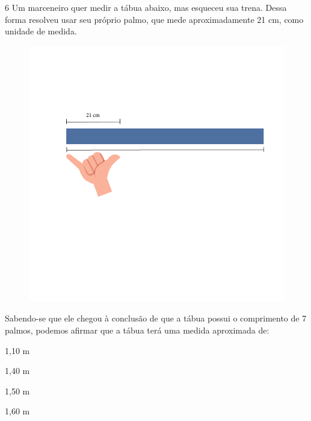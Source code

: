 
\num{6} Um marceneiro quer medir a tábua abaixo, mas esqueceu sua trena.
Dessa forma resolveu usar seu próprio palmo, que mede aproximadamente 
21 cm, como unidade de medida.

\begin{figure}[htpb!]
\includegraphics[width=\textwidth]{../ilustracoes/MAT5/SAEB_5ANO_MAT_figura117.png}
\end{figure}

Sabendo-se que ele chegou à conclusão de que a tábua possui o comprimento
de 7 palmos, podemos afirmar que a tábua terá uma medida aproximada
de:

\begin{escolha}
\item
  1,10 m
\item
  1,40 m
\item
  1,50 m
\item
  1,60 m
\end{escolha}

